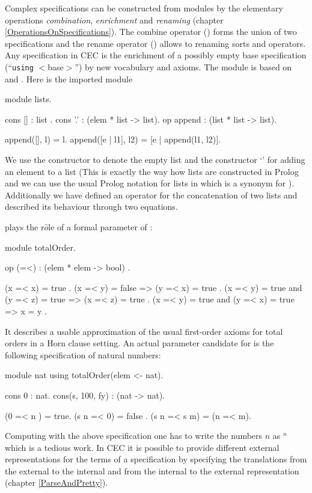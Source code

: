 Complex specifications can be constructed from modules by the 
elementary operations {\em combination}, {\em enrichment} and {\em renaming}
( chapter \ref{OperationsOnSpecifications}).
The combine operator (\cec{+}) forms the union of two specifications and
the rename operator (\cec{<-}) allows to renaming sorts and operators.
Any specification in CEC is the enrichment of a possibly empty base
specification (``{\tt using} $<$base$>$'') by new vocabulary and axioms.
The module  is based on  
and . Here  is the imported module
\begin{spec}
module lists.

cons []   : list .
cons '.'  : (elem * list -> list).
op append : (list * list -> list).

append([], l) = l.
append([e | l1], l2) = [e | append(l1, l2)].
\end{spec}

We use the constructor \cec{[]} to denote the empty list and 
the constructor `' for adding an element to a list
(This is exactly the way how lists are constructed in Prolog and we can
use the usual Prolog notation for lists in which \cec{[e|l]} is
a synonym for ). 
Additionally we have defined an 
operator  for the concatenation of two lists and described 
its behaviour through two equations.

 plays the r$\hat{o}$le of a formal parameter
of :
\begin{spec}
module totalOrder.

op (=<) : (elem * elem -> bool) .

(x =< x) = true .
(x =< y) = false => (y =< x) = true .
(x =< y) = true and (y =< z) = true => (x =< z) = true .
(x =< y) = true and (y =< x) = true => x = y .
\end{spec}

It describes a usable approximation of the usual first-order axioms
for total orders in a Horn clause setting.
An actual parameter candidate for  is
the following specification of natural numbers:
\begin{spec}
module nat using totalOrder(elem <- nat).

cons 0 : nat.
cons(s, 100, fy) :  (nat -> nat).

(0 =< n ) = true.
(s n =< 0) = false .
(s n =< s m) = (n =< m).
\end{spec}

Computing with the above specification one has to write the numbers
$n$ as $^n$ which is a tedious work. In CEC it is possible to provide different external
representations for the terms of a specification by specifying
the translations from the external to the internal
and from the internal to the external representation 
( chapter \ref{ParseAndPretty}).

